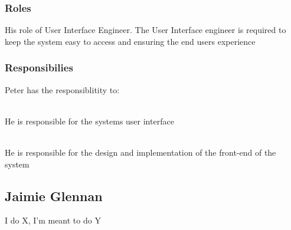 
\subsubsection{Roles}

	His role of User Interface Engineer. The User Interface engineer is required to keep the system easy to access and ensuring the end users experience 


\subsubsection{Responsibilies}

	Peter has the responsiblitity to:

	\begin{description}
		\item[User Interface] \hfill \\ He is responsible for the systems user interface
		\item[Front-End Developer] \hfill \\ He is responsible for the design and implementation of the front-end of the system
		\item
	\end{description}


\subsection{Jaimie Glennan}

I do X, I'm meant to do Y



